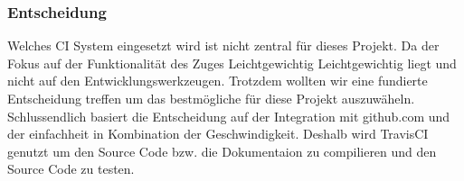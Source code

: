 \documentclass[../../main.tex]{subfiles}
\begin{document}
\subsubsection{Entscheidung}
Welches CI System eingesetzt wird ist nicht zentral für dieses Projekt. Da der Fokus auf der Funktionalität des Zuges Leichtgewichtig Leichtgewichtig
liegt und nicht auf den Entwicklungswerkzeugen. Trotzdem wollten wir eine fundierte Entscheidung treffen um das bestmögliche für diese Projekt auszuwäheln.
Schlussendlich basiert die Entscheidung auf der Integration mit github.com und der einfachheit in Kombination der Geschwindigkeit.
Deshalb wird TravisCI genutzt um den Source Code bzw. die Dokumentaion zu compilieren und den Source Code zu testen.
\end{document}
